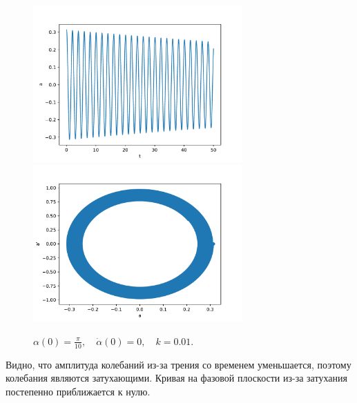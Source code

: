             \begin{figure}[H]
                \centering
                \includegraphics[width=8cm]{pictures/3resonance2.pdf}
                \includegraphics[width=8cm]{pictures/3resonance2p.pdf}
                \caption{$\alpha(0) = \frac{\pi}{10}, \quad \dot{\alpha}(0) = 0, \quad k = 0.01$.}
            \end{figure}

            Видно, что амплитуда колебаний из-за трения со временем уменьшается, поэтому колебания являются затухающими. Кривая на фазовой плоскости из-за затухания постепенно приближается к нулю.

